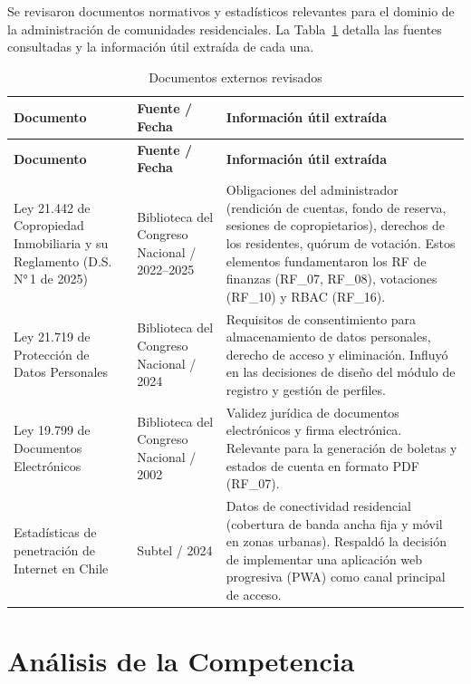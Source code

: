 Se revisaron documentos normativos y estadísticos relevantes para el dominio de la administración de comunidades residenciales. La Tabla~\ref{tab:documentos-externos} detalla las fuentes consultadas y la información útil extraída de cada una.

\begin{longtable}{|p{}|p{}|p{}|}
\caption{Documentos externos revisados}\label{tab:documentos-externos}\\
\hline
\textbf{Documento} & \textbf{Fuente / Fecha} & \textbf{Información útil extraída} \\
\hline
\endfirsthead
\hline
\textbf{Documento} & \textbf{Fuente / Fecha} & \textbf{Información útil extraída} \\
\hline
\endhead
\hline
\endfoot

Ley 21.442 de Copropiedad Inmobiliaria y su Reglamento (D.S. N°\,1 de 2025) &
Biblioteca del Congreso Nacional / 2022--2025 &
Obligaciones del administrador (rendición de cuentas, fondo de reserva, sesiones de copropietarios), derechos de los residentes, quórum de votación. Estos elementos fundamentaron los RF de finanzas (RF\_07, RF\_08), votaciones (RF\_10) y RBAC (RF\_16). \\
\hline

Ley 21.719 de Protección de Datos Personales &
Biblioteca del Congreso Nacional / 2024 &
Requisitos de consentimiento para almacenamiento de datos personales, derecho de acceso y eliminación. Influyó en las decisiones de diseño del módulo de registro y gestión de perfiles. \\
\hline

Ley 19.799 de Documentos Electrónicos &
Biblioteca del Congreso Nacional / 2002 &
Validez jurídica de documentos electrónicos y firma electrónica. Relevante para la generación de boletas y estados de cuenta en formato PDF (RF\_07). \\
\hline

Estadísticas de penetración de Internet en Chile &
Subtel / 2024 &
Datos de conectividad residencial (cobertura de banda ancha fija y móvil en zonas urbanas). Respaldó la decisión de implementar una aplicación web progresiva (PWA) como canal principal de acceso. \\

\end{longtable}

\section{Análisis de la Competencia}

